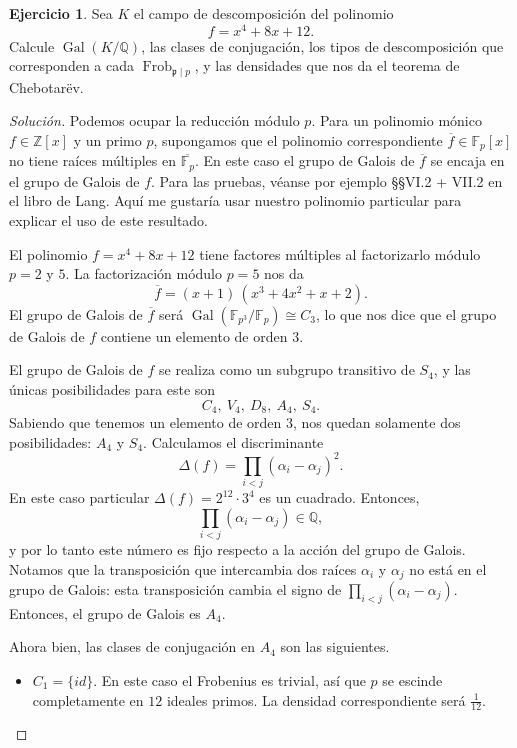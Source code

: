 \documentclass{article}
\newcounter{tarea}
\theoremstyle{definition}
\newtheorem{ejercicio}{Ejercicio}[tarea]
\newenvironment{solucion}{\begin{proof}[Solución]}{\end{proof}}
\DeclareMathOperator{\Gal}{Gal}
\DeclareMathOperator{\Frob}{Frob}
\newcommand{\FF}{\mathbb{F}}
\newcommand{\ZZ}{\mathbb{Z}}
\newcommand{\QQ}{\mathbb{Q}}
\begin{document}
\begin{ejercicio}
  Sea $K$ el campo de descomposición del polinomio
  $$f = x^4 + 8x + 12.$$
  Calcule $\Gal (K/\QQ)$, las clases de conjugación, los tipos de descomposición
  que corresponden a cada $\Frob_{\mathfrak{p}\mid p}$, y las densidades que nos
  da el teorema de Chebotarëv.

  \ifdefined\solutions
  \begin{solucion}
    Podemos ocupar la reducción módulo $p$. Para un polinomio mónico
    $f \in \ZZ [x]$ y un primo $p$, supongamos que el polinomio correspondiente
    $\overline{f} \in \FF_p [x]$ no tiene raíces múltiples en
    $\overline{\FF_p}$.  En este caso el grupo de Galois de $\overline{f}$ se
    encaja en el grupo de Galois de $f$. Para las pruebas, véanse por ejemplo
    \S\S VI.2 + VII.2 en el libro de Lang. Aquí me gustaría usar nuestro
    polinomio particular para explicar el uso de este resultado.

    El polinomio $f = x^4 + 8x + 12$ tiene factores múltiples al factorizarlo
    módulo $p = 2$ y $5$. La factorización módulo $p = 5$ nos da
    $$\overline{f} = (x+1)\,(x^3 + 4x^2 + x + 2).$$
    El grupo de Galois de $\overline{f}$ será
    $\Gal (\FF_{p^3}/\FF_p) \cong C_3$, lo que nos dice que el grupo de Galois
    de $f$ contiene un elemento de orden $3$.

    El grupo de Galois de $f$ se realiza como un subgrupo transitivo de $S_4$, y
    las únicas posibilidades para este son
    $$C_4, ~ V_4, ~ D_8, ~ A_4, ~ S_4.$$
    Sabiendo que tenemos un elemento de orden $3$, nos quedan solamente dos
    posibilidades: $A_4$ y $S_4$. Calculamos el discriminante
    $$\Delta (f) = \prod_{i < j} (\alpha_i - \alpha_j)^2.$$
    En este caso particular $\Delta (f) = 2^{12} \cdot 3^4$ es un
    cuadrado. Entonces,
    $$\prod_{i < j} (\alpha_i - \alpha_j) \in \QQ,$$
    y por lo tanto este número es fijo respecto a la acción del grupo de
    Galois. Notamos que la transposición que intercambia dos raíces $\alpha_i$ y
    $\alpha_j$ no está en el grupo de Galois: esta transposición cambia el signo
    de $\prod_{i < j} (\alpha_i - \alpha_j)$. Entonces, el grupo de Galois es
    $A_4$.

    Ahora bien, las clases de conjugación en $A_4$ son las siguientes.
    \begin{itemize}
    \item $C_1 = \{ id \}$. En este caso el Frobenius es trivial, así que $p$ se
      escinde completamente en $12$ ideales primos. La densidad correspondiente
      será $\frac{1}{12}$.


\end{itemize}
\end{solucion}
\end{ejercicio}
\end{document}
